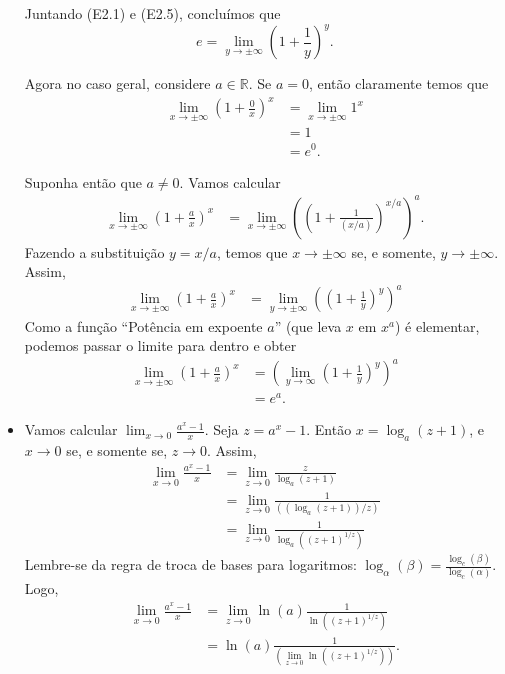 \begin{itemize}
	Juntando (E2.1) e (E2.5), concluímos que
	\[e=\lim_{y\to\pm\infty}\left(1+\frac{1}{y}\right)^{y}.\]
	
	Agora no caso geral, considere $a\in\mathbb{R}$. Se $a=0$, então claramente temos que
	\begin{align*}
	    \lim_{x\to\pm\infty}\left(1+\frac{0}{x}\right)^x
	        &=\lim_{x\to\pm\infty}1^x\\
	        &=1\\
	        &=e^0.
	\end{align*}
	
	Suponha então que $a\neq 0$. Vamos calcular
	\begin{align*}
	    \lim_{x\to\pm\infty}\left(1+\frac{a}{x}\right)^x
	        &=\lim_{x\to\pm\infty}\left(\left(1+\frac{1}{(x/a)}\right)^{x/a}\right)^a.
	\end{align*}
	Fazendo a substituição $y=x/a$, temos que $x\to\pm\infty$ se, e somente, $y\to\pm\infty$. Assim,
	\begin{align*}
	    \lim_{x\to\pm\infty}\left(1+\frac{a}{x}\right)^x
	        &=\lim_{y\to\pm\infty}\left(\left(1+\frac{1}{y}\right)^y\right)^a
	\end{align*}
	Como a função ``Potência em expoente $a$'' (que leva $x$ em $x^a$) é elementar, podemos passar o limite para dentro e obter
	\begin{align*}
	    \lim_{x\to\pm\infty}\left(1+\frac{a}{x}\right)^x
	        &=\left(\lim_{y\to\infty}\left(1+\frac{1}{y}\right)^y\right)^a\\
	        &=e^a.
	\end{align*}
	
	\item Vamos calcular $\lim_{x\to 0}\frac{a^x-1}{x}$. Seja $z=a^x-1$. Então $x=\log_a(z+1)$, e $x\to 0$ se, e somente se, $z\to 0$. Assim,
	\begin{align*}
	    \lim_{x\to 0}\frac{a^x-1}{x}
	        &=\lim_{z\to 0}\frac{z}{\log_a(z+1)}\\
	        &=\lim_{z\to 0}\frac{1}{((\log_a(z+1))/z)}\\
	        &=\lim_{z\to 0}\frac{1}{\log_a((z+1)^{1/z})}
	\end{align*}
	Lembre-se da regra de troca de bases para logaritmos: $\log_\alpha(\beta)=\frac{\log_c(\beta)}{\log_c(\alpha)}$. Logo,
	\begin{align*}
	    \lim_{x\to 0}\frac{a^x-1}{x}
	        &=\lim_{z\to 0}\ln(a)\frac{1}{\ln((z+1)^{1/z})}\\
	        &=\ln(a)\frac{1}{\left(\displaystyle\lim_{z\to 0}\ln((z+1)^{1/z})\right)}.
	\end{align*}
	

\end{itemize}
